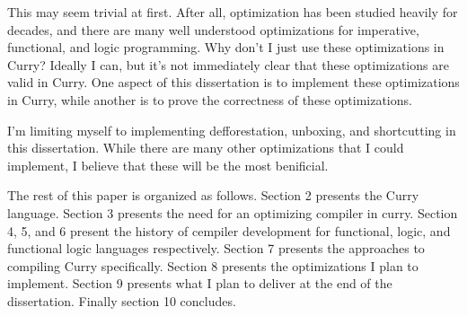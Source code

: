 This may seem trivial at first.  After all, optimization has been studied heavily for decades, and there are many well understood
optimizations for imperative, functional, and logic programming. 
\cite{optminzation_allen, dataflow_allen, LowryMedlock69, dataflow_kildall,
AhoUllman77, continuations_appel, compilers_appel, orbit, ssa_alpern, ssa_Wegman, ssa_wolfe,
steele78, stg-peytonJones, anormal_Flanagan, lambda_rename_steel, lambda_goto,
deforestation_wadler, shortcut_deforestation, haskell_inliner}
Why don't I just use these optimizations in Curry?
Ideally I can, but it's not immediately clear that these optimizations are valid in Curry.
One aspect of this dissertation is to implement these optimizations in Curry,
while another is to prove the correctness of these optimizations.

I'm limiting myself to implementing defforestation, unboxing, and shortcutting in this dissertation.
While there are many other optimizations that I could implement, I believe that these will be the most benificial.

The rest of this paper is organized as follows.
Section 2 presents the Curry language. Section 3 presents the need for an optimizing compiler in curry.
Section 4, 5, and 6 present the history of cempiler development for functional, logic, and functional logic languages respectively.
Section 7 presents the approaches to compiling Curry specifically.
Section 8 presents the optimizations I plan to implement.
Section 9 presents what I plan to deliver at the end of the dissertation.
Finally section 10 concludes.
